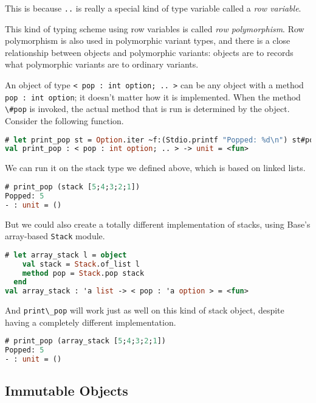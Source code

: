 This is because \passthrough{\lstinline!..!} is really a special kind of
type variable called a \emph{row variable}.

This kind of typing scheme using row variables is called \emph{row
polymorphism}. Row polymorphism is also used in polymorphic variant
types, and there is a close relationship between objects and polymorphic
variants: objects are to records what polymorphic variants are to
ordinary variants.

An object of type \passthrough{\lstinline!< pop : int option; .. >!} can
be any object with a method \passthrough{\lstinline!pop : int option!};
it doesn't matter how it is implemented. When the method
\passthrough{\lstinline!\#pop!} is invoked, the actual method that is
run is determined by the object. Consider the following function.

\begin{lstlisting}[language=Caml]
# let print_pop st = Option.iter ~f:(Stdio.printf "Popped: %d\n") st#pop
val print_pop : < pop : int option; .. > -> unit = <fun>
\end{lstlisting}

We can run it on the stack type we defined above, which is based on
linked lists.

\begin{lstlisting}[language=Caml]
# print_pop (stack [5;4;3;2;1])
Popped: 5
- : unit = ()
\end{lstlisting}

But we could also create a totally different implementation of stacks,
using Base's array-based \passthrough{\lstinline!Stack!} module.

\begin{lstlisting}[language=Caml]
# let array_stack l = object
    val stack = Stack.of_list l
    method pop = Stack.pop stack
  end
val array_stack : 'a list -> < pop : 'a option > = <fun>
\end{lstlisting}

And \passthrough{\lstinline!print\_pop!} will work just as well on this
kind of stack object, despite having a completely different
implementation.

\begin{lstlisting}[language=Caml]
# print_pop (array_stack [5;4;3;2;1])
Popped: 5
- : unit = ()
\end{lstlisting}

\hypertarget{immutable-objects}{%
\subsection{Immutable Objects}\label{immutable-objects}}

